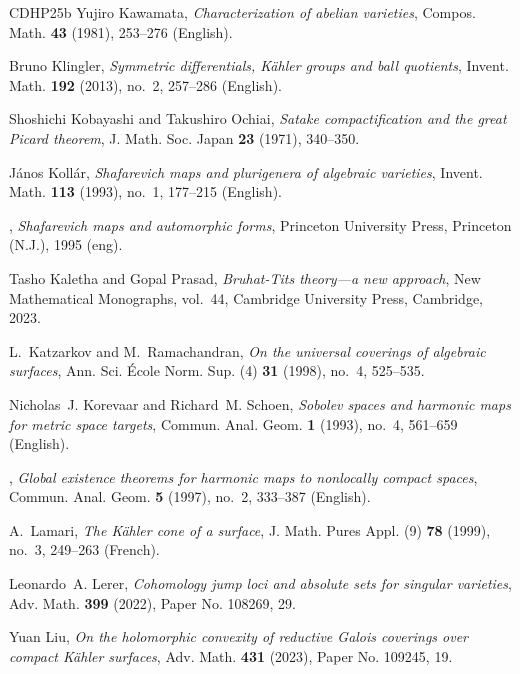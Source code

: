 \documentclass[english]{amsproc}
\theoremstyle{plain}
\theoremstyle{definition}
\theoremstyle{remark}
\theoremstyle{plain}
\numberwithin{equation}{thm} %
\begin{document}
\begin{thebibliography}{CDHP25b}
		Yujiro Kawamata, \emph{Characterization of abelian varieties}, Compos. Math.
		\textbf{43} (1981), 253--276 (English).
		
		Bruno Klingler, \emph{Symmetric differentials, {K{\"a}hler} groups and ball
			quotients}, Invent. Math. \textbf{192} (2013), no.~2, 257--286 (English).
		
		Shoshichi Kobayashi and Takushiro Ochiai, \emph{Satake compactification and the
			great {P}icard theorem}, J. Math. Soc. Japan \textbf{23} (1971), 340--350.
		
		J{\'a}nos Koll{\'a}r, \emph{Shafarevich maps and plurigenera of algebraic
			varieties}, Invent. Math. \textbf{113} (1993), no.~1, 177--215 (English).
		
		\bysame, \emph{Shafarevich maps and automorphic forms}, Princeton University
		Press, Princeton (N.J.), 1995 (eng).
		
		Tasho Kaletha and Gopal Prasad, \emph{Bruhat-{T}its theory---a new approach},
		New Mathematical Monographs, vol.~44, Cambridge University Press, Cambridge,
		2023. 
		
		L.~Katzarkov and M.~Ramachandran, \emph{On the universal coverings of algebraic
			surfaces}, Ann. Sci. \'Ecole Norm. Sup. (4) \textbf{31} (1998), no.~4,
		525--535. 
		
		Nicholas~J. Korevaar and Richard~M. Schoen, \emph{{Sobolev spaces and harmonic
				maps for metric space targets}}, {Commun. Anal. Geom.} \textbf{1} (1993),
		no.~4, 561--659 (English).
		
		\bysame, \emph{Global existence theorems for harmonic maps to nonlocally
			compact spaces}, Commun. Anal. Geom. \textbf{5} (1997), no.~2, 333--387
		(English).
		
		A.~Lamari, \emph{The {K{\"a}hler} cone of a surface}, J. Math. Pures Appl. (9)
		\textbf{78} (1999), no.~3, 249--263 (French).
		
		Leonardo~A. Lerer, \emph{Cohomology jump loci and absolute sets for singular
			varieties}, Adv. Math. \textbf{399} (2022), Paper No. 108269, 29.
		
		Yuan Liu, \emph{On the holomorphic convexity of reductive {G}alois coverings
			over compact {K}\"ahler surfaces}, Adv. Math. \textbf{431} (2023), Paper No.
		109245, 19. 
		

\end{thebibliography}
\end{document}

